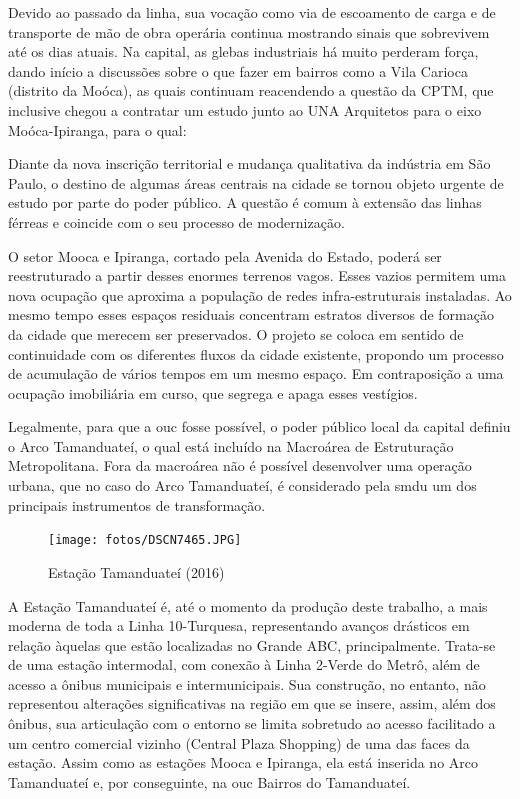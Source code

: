 	Devido ao passado da linha, sua vocação como via de escoamento de carga e de transporte de mão de obra operária continua mostrando sinais que sobrevivem até os dias atuais. Na capital, as glebas industriais há muito perderam força, dando início a discussões sobre o que fazer em bairros como a Vila Carioca (distrito da Moóca), as quais continuam reacendendo a questão da CPTM, que inclusive chegou a contratar um estudo junto ao UNA Arquitetos para o eixo Moóca-Ipiranga, para o qual:
	
	\begin{citacao}
		Diante da nova inscrição territorial e mudança qualitativa da indústria em São Paulo, o destino de algumas áreas centrais na cidade se tornou objeto urgente de estudo por parte do poder público. A questão é comum à extensão das linhas férreas e coincide com o seu processo de modernização.
		
		O setor Mooca e Ipiranga, cortado pela Avenida do Estado, poderá ser reestruturado a partir desses enormes terrenos vagos. Esses vazios permitem uma nova ocupação que aproxima a população de redes infra-estruturais instaladas. Ao mesmo tempo esses espaços residuais concentram estratos diversos de formação da cidade que merecem ser preservados. O projeto se coloca em sentido de continuidade com os diferentes fluxos da cidade existente, propondo um processo de acumulação de vários tempos em um mesmo espaço. Em contraposição a uma ocupação imobiliária em curso, que segrega e apaga esses vestígios.
		\cite{unaarq}
	\end{citacao}
	
	Legalmente, para que a \gls{ouc} fosse possível, o poder público local da capital definiu o Arco Tamanduateí, o qual está incluído na Macroárea de Estruturação Metropolitana. Fora da macroárea não é possível desenvolver uma operação urbana, que no caso do Arco Tamanduateí, é considerado pela \gls{smdu} um dos principais instrumentos de transformação\cite{smdumacro}.

	\begin{figure}[h]
		\caption{Estação Tamanduateí (2016)}
		\texttt{[image: fotos/DSCN7465.JPG]}
	\end{figure}
	
	A Estação Tamanduateí é, até o momento da produção deste trabalho, a mais moderna de toda a Linha 10-Turquesa, representando avanços drásticos em relação àquelas que estão localizadas no Grande ABC, principalmente. Trata-se de uma estação intermodal, com conexão à Linha 2-Verde do Metrô, além de acesso a ônibus municipais e intermunicipais. Sua construção, no entanto, não representou alterações significativas na região em que se insere, assim, além dos ônibus, sua articulação com o entorno se limita sobretudo ao acesso facilitado a um centro comercial vizinho (Central Plaza Shopping) de uma das faces da estação. Assim como as estações Mooca e Ipiranga, ela está inserida no Arco Tamanduateí e, por conseguinte, na \gls{ouc} Bairros do Tamanduateí.

